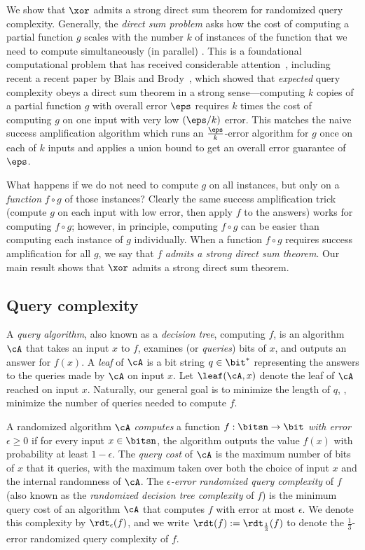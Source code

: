 \documentclass{toc}
\begin{document}
We show that $\xor$ admits a strong direct sum theorem for randomized
query complexity.  Generally, the \emph{direct sum problem} asks how
the cost of computing a
partial %
function $g$ scales with the number $k$ of
instances of the function that we need to compute
simultaneously (in parallel) %
.
%
%
This is a
foundational computational problem that has received considerable
attention~\cite{ImpagliazzoRW94,BenAsherN95,NisanRS99, Shaltiel03,
  JainKS10, BenDavidK18,Drucker12, BlaisB19, BenDavidB20a, BenDavidB20b,
  BenDavidGKW20}, including recent %
a recent paper by %
Blais and
Brody~\cite{BlaisB19}, which showed that %
\emph{expected} %
%
query complexity obeys a direct sum theorem in a strong
%
sense---computing  %
$k$ copies of a
partial %
function $g$ with overall error
$\eps$ requires $k$ times the cost of computing $g$ on one input with
very low %
%
$(\eps/k)$ error.  %
This matches the naive success
amplification algorithm which runs an $\frac{\eps}{k}$-error algorithm for
$g$ once on each of $k$ inputs and applies a union bound to get an
overall error guarantee of $\eps$.

What happens if we %
do not %
need to compute $g$ on all instances, but
only on a \emph{function} $f\circ g$ of those instances?  Clearly the
same success amplification trick (compute $g$ on each input with low
error, then apply $f$ to the answers) works for computing $f\circ g$;
however, in principle, computing $f\circ g$ can be easier than
computing each instance of $g$ individually.  When a function
$f\circ g$ requires success amplification for all $g$, we say that $f$
\emph{admits a strong direct sum theorem}.  Our main result shows that
$\xor$ admits a strong direct sum theorem.


%
\subsection{Query complexity}  %
%
A \emph{query algorithm},  %
also known as a \emph{decision tree},  %
computing $f$, is an algorithm $\cA$ that takes %
an input $x$ to $f$, examines (or \emph{queries}) bits of $x$, and
outputs an answer for $f(x)$.  A \emph{leaf} of $\cA$ is a bit string
$q \in \bit^*$ representing the answers to the queries made by $\cA$
on input $x$.  Let $\leaf(\cA,x)$ denote the leaf of $\cA$ reached on input
$x$.  Naturally, our general goal is to minimize the 
length of $q$, %
\ie, minimize the number of queries needed to compute $f$.

A randomized algorithm $\cA$ \emph{computes} a function
$f : \bitsn \to \bit$ \emph{with error $\epsilon \ge 0$} if for every
input $x \in \bitsn$, the algorithm outputs the value $f(x)$ with
probability at least $1-\epsilon$.  The \emph{query cost} of $\cA$ is
the maximum number of bits of $x$ that it queries, with the
maximum taken over both the choice of input $x$ and the internal
randomness of $\cA$.  The \emph{$\epsilon$-error %
  randomized query complexity} of $f$ (also known as the
\emph{randomized decision tree complexity} of $f$) is the minimum
query cost of an algorithm $\cA$ that computes $f$ with error at
most $\epsilon$. We denote this complexity by $\rdt_\epsilon(f)$, and
we write $\rdt(f) := \rdt_{\frac13}(f)$ to denote the $\frac13$-error
randomized query complexity of $f$.
\end{document}
